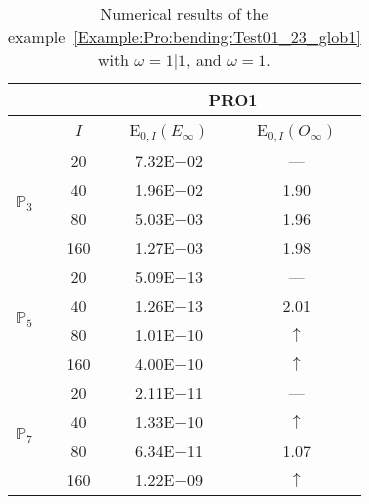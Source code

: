 \begin{table}[H]
\caption{Numerical results of the example~\ref{Example:Pro:bending:Test01_23_glob1} with $\omega=1|1$, and $\omega=1$.}
\setlength{\tabcolsep}{5pt}
\centering
\begin{tabular}{@{}l c c c@{}}
\toprule
 &  & \multicolumn{2}{c}{PRO1}\\
\midrule
 & $I$ & E$_{0,I}(E_{\infty})$ & E$_{0,I}(O_{\infty})$\\
\midrule
\multirow{4}{*}{$\mathbb{P}_{3}$} & 20 & 7.32E$-$02 & ---\\
 & 40 & 1.96E$-$02 & 1.90\\
 & 80 & 5.03E$-$03 & 1.96\\
 & 160 & 1.27E$-$03 & 1.98\\
\midrule
\multirow{4}{*}{$\mathbb{P}_{5}$} & 20 & 5.09E$-$13 & ---\\
 & 40 & 1.26E$-$13 & 2.01\\
 & 80 & 1.01E$-$10 & $\uparrow$\\
 & 160 & 4.00E$-$10 & $\uparrow$\\
\midrule
\multirow{4}{*}{$\mathbb{P}_{7}$} & 20 & 2.11E$-$11 & ---\\
 & 40 & 1.33E$-$10 & $\uparrow$\\
 & 80 & 6.34E$-$11 & 1.07\\
 & 160 & 1.22E$-$09 & $\uparrow$\\
\bottomrule
\end{tabular}
\label{Table:PRO:test_01_23_test9}
\end{table}
